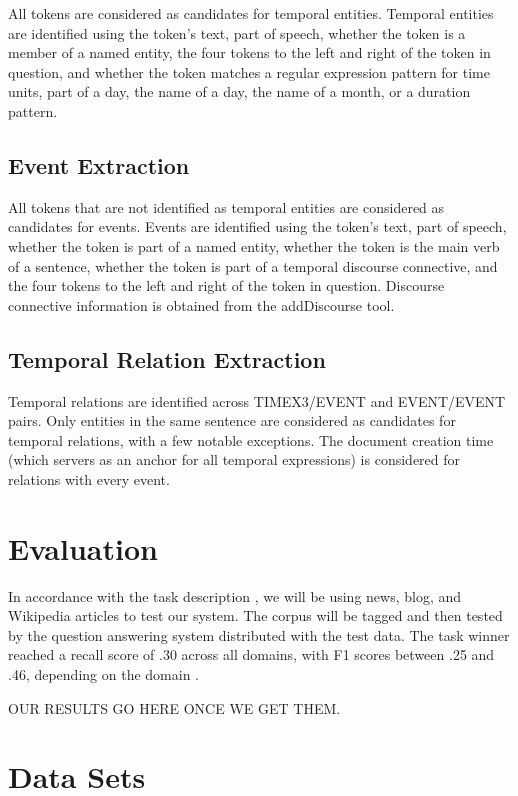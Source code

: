 \documentclass[11pt,letterpaper]{article}
\begin{document}
All tokens are considered as candidates for temporal entities. Temporal entities are identified using the token's text, part of speech, whether the token is a member of a named entity, the four tokens to the left and right of the token in question, and whether the token matches a regular expression pattern for time units, part of a day, the name of a day, the name of a month, or a duration pattern. 

\subsection{Event Extraction}

All tokens that are not identified as temporal entities are considered as candidates for events. Events are identified using the token's text, part of speech, whether the token is part of a named entity, whether the token is the main verb of a sentence, whether the token is part of a temporal discourse connective, and the four tokens to the left and right of the token in question. Discourse connective information is obtained from the addDiscourse tool.

\subsection{Temporal Relation Extraction}

Temporal relations are identified across TIMEX3/EVENT and EVENT/EVENT pairs. Only entities in the same sentence are considered as candidates for temporal relations, with a few notable exceptions. The document creation time (which servers as an anchor for all temporal expressions) is considered for relations with every event. 

\section{Evaluation}

In accordance with the task description \cite{Llorens:15}, we will be using news, blog, and Wikipedia articles to test our system. The corpus will be tagged and then tested by the question answering system distributed with the test data. The task winner reached a recall score of .30 across all domains, with F1 scores between .25 and .46, depending on the domain \cite{Mirza:15}. 

OUR RESULTS GO HERE ONCE WE GET THEM.

\section{Data Sets}
\end{document}
